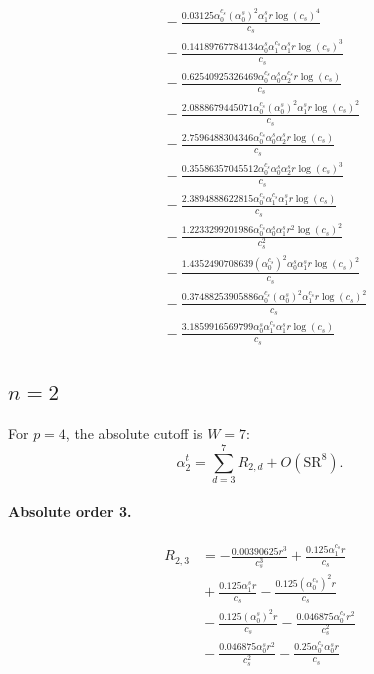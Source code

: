 \documentclass[10pt]{article}
\begin{document}
\begin{align*}
&{}  - \frac{0.03125 \alpha_{0}^{c_s} \left(\alpha_{0}^s\right)^{2} \alpha_{1}^s r \log{\left(c_{s} \right)}^{4}}{c_{s}} \\
&{}  - \frac{0.14189767784134 \alpha_{0}^s \alpha_{1}^{c_s} \alpha_{1}^s r \log{\left(c_{s} \right)}^{3}}{c_{s}} \\
&{}  - \frac{0.62540925326469 \alpha_{0}^{c_s} \alpha_{0}^s \alpha_{2}^{c_s} r \log{\left(c_{s} \right)}}{c_{s}} \\
&{}  - \frac{2.0888679445071 \alpha_{0}^{c_s} \left(\alpha_{0}^s\right)^{2} \alpha_{1}^s r \log{\left(c_{s} \right)}^{2}}{c_{s}} \\
&{}  - \frac{2.7596488304346 \alpha_{0}^{c_s} \alpha_{0}^s \alpha_{2}^s r \log{\left(c_{s} \right)}}{c_{s}} \\
&{}  - \frac{0.35586357045512 \alpha_{0}^{c_s} \alpha_{0}^s \alpha_{2}^s r \log{\left(c_{s} \right)}^{3}}{c_{s}} \\
&{}  - \frac{2.3894888622815 \alpha_{0}^{c_s} \alpha_{1}^{c_s} \alpha_{1}^s r \log{\left(c_{s} \right)}}{c_{s}} \\
&{}  - \frac{1.2233299201986 \alpha_{0}^{c_s} \alpha_{0}^s \alpha_{1}^s r^{2} \log{\left(c_{s} \right)}^{2}}{c_{s}^{2}} \\
&{}  - \frac{1.4352490708639 \left(\alpha_{0}^{c_s}\right)^{2} \alpha_{0}^s \alpha_{1}^s r \log{\left(c_{s} \right)}^{2}}{c_{s}} \\
&{}  - \frac{0.37488253905886 \alpha_{0}^{c_s} \left(\alpha_{0}^s\right)^{2} \alpha_{1}^{c_s} r \log{\left(c_{s} \right)}^{2}}{c_{s}} \\
&{}  - \frac{3.1859916569799 \alpha_{0}^s \alpha_{1}^{c_s} \alpha_{1}^s r \log{\left(c_{s} \right)}}{c_{s}}
\end{align*}

\subsection{$n=2$}
For $p=4$, the absolute cutoff is $W=7$:
\[\alpha_{2}^t=\sum_{d=3}^{7}R_{2,d}+O(\mathrm{SR}^{8}).\]
\paragraph{Absolute order 3.}
\begin{align*}
R_{2,3} &=  - \frac{0.00390625 r^{3}}{c_{s}^{3}} + \frac{0.125 \alpha_{1}^{c_s} r}{c_{s}} \\
&{}  + \frac{0.125 \alpha_{1}^s r}{c_{s}} - \frac{0.125 \left(\alpha_{0}^{c_s}\right)^{2} r}{c_{s}} \\
&{}  - \frac{0.125 \left(\alpha_{0}^s\right)^{2} r}{c_{s}} - \frac{0.046875 \alpha_{0}^{c_s} r^{2}}{c_{s}^{2}} \\
&{}  - \frac{0.046875 \alpha_{0}^s r^{2}}{c_{s}^{2}} - \frac{0.25 \alpha_{0}^{c_s} \alpha_{0}^s r}{c_{s}}
\end{align*}
\end{document}
